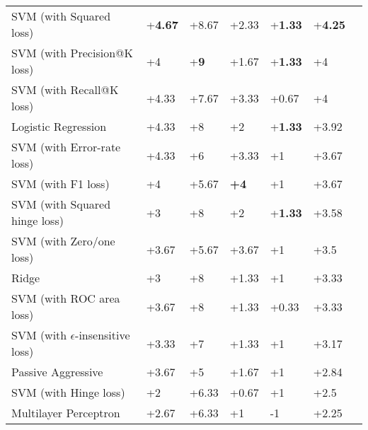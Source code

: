 \begin{table}
{\begin{tabular}{@{}lllllll@{}}
SVM (with Squared loss)                               & +\textbf{4.67}  & +8.67     & +2.33           & +\textbf{1.33}     & +\textbf{4.25} \\
SVM (with Precision@K loss)                            & +4              & +\textbf{9}                 & +1.67           & +\textbf{1.33}     & +4             \\
SVM (with Recall@K loss)                                 & +4.33           & +7.67              & +3.33           & +0.67              & +4             \\
Logistic Regression                                    & +4.33           & +8                 & +2              & +\textbf{1.33}     & +3.92          \\
SVM (with Error-rate loss)                             & +4.33           & +6                 & +3.33           & +1                 & +3.67          \\
SVM (with F1 loss)                                     & +4              & +5.67              & \textbf{+4}     & +1                 & +3.67          \\
SVM (with Squared hinge loss)                           & +3              & +8                 & +2              & +\textbf{1.33}     & +3.58          \\
SVM (with Zero/one loss)                               & +3.67           & +5.67              & +3.67		  & +1                 & +3.5           \\
Ridge                                                   & +3              & +8                 & +1.33           & +1                 & +3.33          \\
SVM (with ROC area loss)                                & +3.67           & +8                 & +1.33           & +0.33              & +3.33          \\
SVM (with $\epsilon$-insensitive loss)                   & +3.33           & +7                 & +1.33           & +1                 & +3.17          \\
Passive Aggressive                                       & +3.67           & +5                 & +1.67           & +1                 & +2.84          \\
SVM (with Hinge loss)                                    & +2              & +6.33              & +0.67           & +1                 & +2.5           \\
Multilayer Perceptron                                 & +2.67           & +6.33              & +1              & -1                & +2.25          \\

\end{tabular}}
\end{table}
